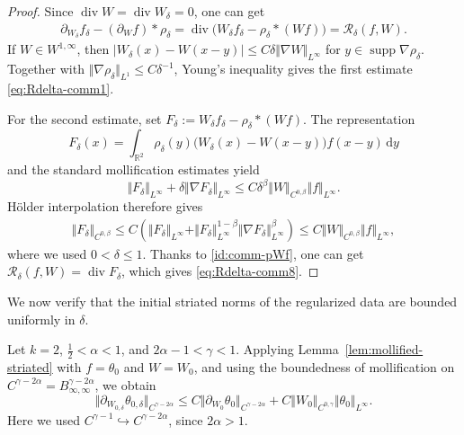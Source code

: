 \documentclass[reqno,11pt,a4paper]{amsart}
\newcommand{\dd}{\mathrm{d}}
\begin{document}
\begin{proof}
Since $\operatorname{div}W=\operatorname{div}W_\delta=0$, one can get
\begin{align}\label{id:comm-pWf}
  \partial_{W_\delta}f_\delta
  -(\partial_Wf)*\rho_\delta
  =
  \operatorname{div}\bigl(
    W_\delta f_\delta-\rho_\delta*(Wf)
  \bigr)
  =\mathcal R_\delta(f,W).
\end{align}
If $W\in W^{1,\infty}$, then $|W_\delta(x)-W(x-y)|
  \leq C\delta\Vert \nabla W\Vert _{L^\infty}$ for $y\in\operatorname{supp}\nabla\rho_\delta$. 
Together with
$\Vert \nabla\rho_\delta\Vert _{L^1}\leq C\delta^{-1}$,
Young's inequality gives the first estimate \eqref{eq:Rdelta-comm1}.

For the second estimate, set $F_\delta:=W_\delta f_\delta-\rho_\delta*(Wf)$. 
The representation
\[
  F_\delta(x)
  =
  \int_{\mathbb R^2}
  \rho_\delta(y)
  \bigl(W_\delta(x)-W(x-y)\bigr)f(x-y)\,\dd y
\]
and the standard mollification estimates yield
\[
  \Vert F_\delta\Vert _{L^\infty}
  +\delta\Vert \nabla F_\delta\Vert _{L^\infty}
  \leq
  C\delta^\beta
  \Vert W\Vert _{C^{0,\beta}}\Vert f\Vert _{L^\infty}.
\]
H\"older interpolation therefore gives
\begin{align*}
  \Vert F_\delta\Vert _{C^{0,\beta}}
  \leq
  C\left(
    \Vert F_\delta\Vert _{L^\infty}
    +
    \Vert F_\delta\Vert _{L^\infty}^{1-\beta}
    \Vert \nabla F_\delta\Vert _{L^\infty}^{\beta}
  \right)
  \leq
  C\Vert W\Vert _{C^{0,\beta}}\Vert f\Vert _{L^\infty},
\end{align*}
where we used $0<\delta\leq1$. Thanks to \eqref{id:comm-pWf}, one can get $\mathcal R_\delta(f,W)=\operatorname{div}F_\delta$, which gives
\eqref{eq:Rdelta-comm8}.
\end{proof}




We now verify that the initial striated norms
of the regularized data are bounded uniformly in $\delta$.

Let $k=2$, $\frac12<\alpha<1$, and
$2\alpha-1<\gamma<1$.
Applying Lemma~\ref{lem:mollified-striated}
with $f=\theta_0$ and $W=W_0$, and using
the boundedness of mollification on
$C^{\gamma-2\alpha}
=B^{\gamma-2\alpha}_{\infty,\infty}$, we obtain
\[
  \Vert \partial_{W_{0,\delta}}\theta_{0,\delta}
    \Vert _{C^{\gamma-2\alpha}}
  \leq
  C\Vert \partial_{W_0}\theta_0\Vert _{C^{\gamma-2\alpha}}
  +C\Vert W_0\Vert _{C^{0,\gamma}}\Vert \theta_0\Vert _{L^\infty}.
\]
Here we used
$C^{\gamma-1}\hookrightarrow C^{\gamma-2\alpha}$,
since $2\alpha>1$.
\end{document}
